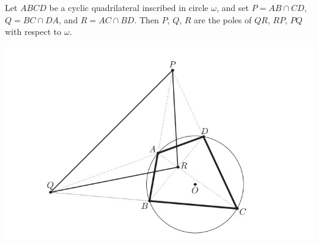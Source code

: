 \documentclass{scrartcl}
\begin{document}
\begin{theorem}
Let $ABCD$ be a cyclic quadrilateral inscribed in circle $\omega$, and set $P=AB\cap CD$, $Q=BC\cap DA$, and $R=AC\cap BD$. Then $P$, $Q$, $R$ are the poles of $QR$, $RP$, $PQ$ with respect to $\omega$. 
\end{theorem}
\begin{center}
    \includegraphics[scale=1]{figure95.jpg}
\end{center}
\end{document}
